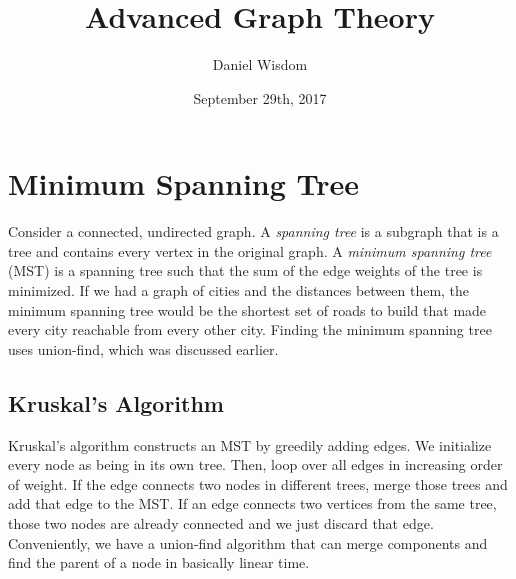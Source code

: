 \documentclass{article}
\title{Advanced Graph Theory}
\author{Daniel Wisdom}
\date{September 29th, 2017}
\begin{document}
\maketitle

\section{Minimum Spanning Tree}

Consider a connected, undirected graph. A \textit{spanning tree} is a subgraph that is a tree and contains every vertex in the original graph. A \textit{minimum spanning tree} (MST) is a spanning tree such that the sum of the edge weights of the tree is minimized. If we had a graph of cities and the distances between them, the minimum spanning tree would be the shortest set of roads to build that made every city reachable from every other city.  Finding the minimum spanning tree uses union-find, which was discussed earlier.  

\begin{center}
\end{center}


\subsection{Kruskal's Algorithm}

Kruskal's algorithm constructs an MST by greedily adding edges. We initialize every node as being in its own tree.  Then, loop over all edges in increasing order of weight.  If the edge connects two nodes in different trees, merge those trees and add that edge to the MST.  If an edge connects two vertices from the same tree, those two nodes are already connected and we just discard that edge. Conveniently, we have a union-find algorithm that can merge components and find the parent of  a node in basically linear time.
\end{document}
